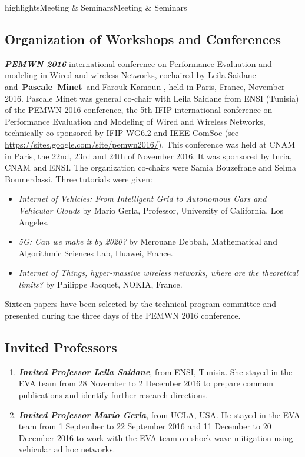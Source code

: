 \documentclass{ra2016}
\newcommand{\pascale}          {\textbf{Pascale~Minet}}
\begin{document}
\begin{module}{highlights}{Meeting \& Seminars}{Meeting \& Seminars}
\subsection{Organization of Workshops and Conferences}
    \textit{\textbf{PEMWN 2016}} international conference on Performance Evaluation and modeling in Wired and wireless Networks, cochaired by Leila Saidane and~\pascale~and Farouk Kamoun , held in Paris, France, November 2016. Pascale Minet was general co-chair with Leila Saidane from ENSI (Tunisia) of the PEMWN 2016 conference, the 5th IFIP international conference on Performance Evaluation and Modeling of Wired and Wireless Networks, technically co-sponsored by IFIP WG6.2 and IEEE ComSoc (see \url{https://sites.google.com/site/pemwn2016/}). This conference was held  at CNAM in Paris, the 22nd, 23rd and 24th of November 2016. It was sponsored by Inria, CNAM and ENSI. The organization co-chairs were Samia Bouzefrane and Selma Boumerdassi. Three tutorials were given:
\begin{itemize}
\item  \emph{Internet of Vehicles: From Intelligent Grid to Autonomous Cars and Vehicular Clouds} by Mario Gerla, Professor, University of California, Los Angeles.
\item \emph{5G: Can we make it by 2020?} by  Merouane Debbah,  Mathematical and Algorithmic Sciences Lab, Huawei, France.
\item \emph{ Internet of Things, hyper-massive wireless networks, where are the theoretical limits?} by Philippe Jacquet, NOKIA, France.
\end{itemize}
Sixteen papers have been selected by the technical program committee and presented during the three days of the PEMWN 2016 conference.\\
   

\subsection{Invited Professors}
\begin{enumerate}
    \item \textit{\textbf{Invited Professor Leila Saidane}}, from ENSI, Tunisia. She stayed in the EVA team from  28 November to 2 December 2016 to prepare common publications and identify further research directions.
       \item \textit{\textbf{Invited Professor Mario Gerla}}, from UCLA, USA. He stayed in the EVA team from 1  September to 22 September 2016 and 11 December to 20 December 2016 to work with the EVA team on shock-wave mitigation using vehicular ad hoc networks. 
\end{enumerate} 

\end{module}
\end{document}
